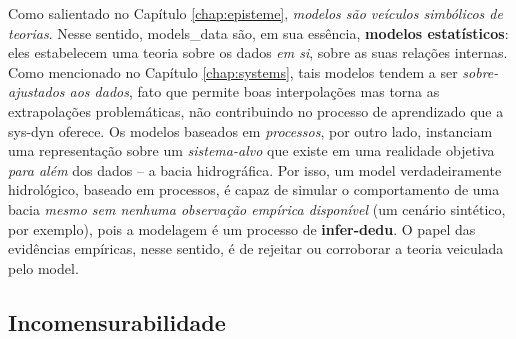 \documentclass[./main.tex]{subfiles}
\begin{document}
\noindent Como salientado no Capítulo \ref{chap:episteme}, \textit{modelos são veículos simbólicos de teorias}. Nesse sentido, \gls{models_data} são, em sua essência, \textbf{modelos estatísticos}: eles estabelecem uma \gls{teoria} sobre os dados \textit{em si}, sobre as suas relações internas. Como mencionado no Capítulo \ref{chap:systems}, tais modelos tendem a ser \textit{sobre-ajustados aos dados}, fato que permite boas interpolações mas torna as extrapolações problemáticas, não contribuindo no processo de aprendizado que a \gls{sys-dyn} oferece. Os modelos baseados em \textit{processos}, por outro lado, instanciam uma representação sobre um \textit{sistema-alvo} que existe em uma realidade objetiva \textit{para além} dos dados -- a bacia hidrográfica. Por isso, um \gls{model} verdadeiramente hidrológico, baseado em processos, é capaz de simular o comportamento de uma bacia \textit{mesmo sem nenhuma observação empírica disponível} (um cenário sintético, por exemplo), pois a modelagem é um processo de \textbf{\gls{infer-dedu}}. O papel das evidências empíricas, nesse sentido, é de rejeitar ou corroborar a \gls{teoria} veiculada pelo \gls{model}.

\subsection{Incomensurabilidade} \label{sec:hydro:incomm}
\end{document}
